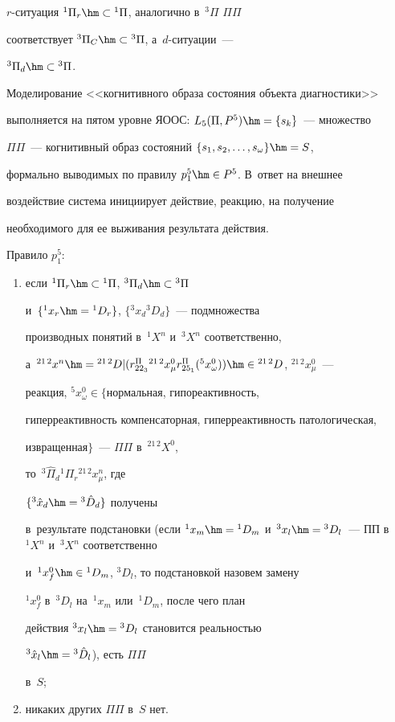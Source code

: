 $r$-си\-ту\-ация ${}^1\Pi_r\hm\subset {}^1\Pi$, аналогично в~${}^3\Pi$ $\Pi\Pi$ 

соответствует ${}^3\Pi_C\hm\subset {}^3\Pi$, а~$d$-си\-ту\-ации~--- 

${}^3\Pi_d\hm\subset {}^3\Pi$.

  

  Моделирование <<когнитивного образа состояния объекта диагностики>> 

выполняется на пятом уровне ЯООС: $L_5(\Pi, P^5)\hm= \{s_k\}$~--- множество 

$\Pi\Pi$~--- когнитивный образ состояний $\{s_1, s_2,\ldots , s_\omega\}\hm= S$, 

формально выводимых по правилу $p_1^5\hm\in P^5$. В~ответ на внешнее 

воздействие система инициирует действие, реакцию, на получение 

необходимого для ее выживания результата действия. 

  

  Правило $p_1^5$: 

  \begin{enumerate}[(1)]

  \item  если ${}^1\Pi_r\hm\subset {}^1\Pi$, ${}^3\Pi_d\hm\subset {}^3\Pi$ 

и~$\{{}^1 x_r\hm= {}^1D_r\}$, $\{{}^3x_d{}^3D_d\}$~--- подмножества 

производных понятий в~${}^1X^n$ и~${}^3X^n$ соответственно, 

а~${}^{21\,2} x^n\hm= {}^{21\,2}D\vert (r_{22_3}^{\Pi} {}^{21\,2} x^0_\mu 

r_{25_1}^{\Pi} ({}^5 x^0_\omega))\hm\in {}^{21\,2} D$, ${}^{21\,2}x_\mu^0$~--- 

реакция, ${}^5x^0_\omega\in\{$нормальная, гипореактивность, 

гиперреактивность компенсаторная, гиперреактивность патологическая, 

извращенная$\}$~--- $\Pi\Pi$ в~${}^{21\,2}X^0$, 

то~${}^3\hat{\Pi}_d{}^1\Pi_r {}^{21\,2}x_\mu^n$, где 

$\{ {}^3\hat{x}_d\hm={}^3\hat{D}_d\}$ получены 

в~результате подстановки (если ${}^1x_m\hm= {}^1D_m$ и~${}^3x_l\hm= 

{}^3D_l$~--- ПП в~${}^1X^n$ и~${}^3X^n$ соответственно 

и~${}^1x_f^0\hm\in {}^1D_m$, ${}^3D_l$, то подстановкой назовем замену 

${}^1x_f^0$ в~${}^3D_l$ на~${}^1x_m$ или~${}^1D_m$, после чего план 

действия ${}^3x_l\hm= {}^3D_l$ становится реальностью 

${}^3\hat{x}_l\hm= {}^3\hat{D}_l$), есть $\Pi\Pi$ 

в~$S$; 

  \item никаких других $\Pi\Pi$ в~$S$ нет.

  \end{enumerate}

